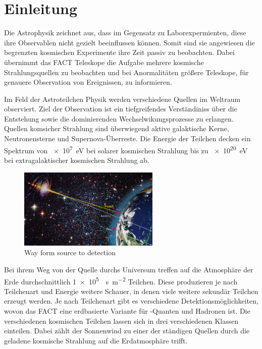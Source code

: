 \chapter{Einleitung}
Die Astrophysik zeichnet aus, dass im Gegensatz zu Laborexpermienten, diese ihre Observablen nicht gezielt beeinflussen können.
Somit sind sie angewiesen die begrenzten kosmischen Experimente ihre Zeit passiv zu beobachten. 
Dabei übernimmt das FACT Teleskope die Aufgabe mehrere kosmische Strahlungsquellen zu beobachten und bei Anormalitäten größere Teleskope, für genauere Observation von Ereignissen, zu informieren. 

Im Feld der Astroteilchen Physik werden verschiedene Quellen im Weltraum observiert.
Ziel der Observation ist ein tiefgreifendes Verständiniss über die Entstehung sowie die dominierenden Wechselwikungsprozesse zu erlangen. 
Quellen komsicher Strahlung sind überwiegend aktive galaktische Kerne, Neutronensterne und Supernova-Überreste. 
Die Energie der Teilchen decken ein Spektrum von \SI{e7}{\electronvolt} bei solarer kosmischen Strahlung bis zu \SI{e20}{\electronvolt} bei extragalaktischer kosmischen Strahlung ab. 

\begin{figure}
  \centering
  \includegraphics[width=0.6\textwidth]{./images/sources-detection.jpg}
  \caption{Way form source to detection~\cite{overview-detec}}
\end{figure}

Bei ihrem Weg von der Quelle durchs Universum treffen auf die Atmosphäre der Erde durchschnittlich \SI{1e5}{\per\second\per\meter\squared} Teilchen.
Diese produzieren je nach Teilchenart und Energie weitere Schauer, in denen viele weitere sekundär Teilchen erzeugt werden. 
Je nach Teilchenart gibt es verschiedene Detektionsmöglichkeiten, wovon das FACT eine erdbasierte Variante für \gamma-Quanten und Hadronen ist. 
Die verschiedenen kosmischen Teilchen lassen sich in drei verschiedenen Klassen einteilen. 
Dabei zählt der Sonnenwind zu einer der ständigen Quellen durch die geladene kosmische Strahlung auf die Erdatmosphäre trifft.


